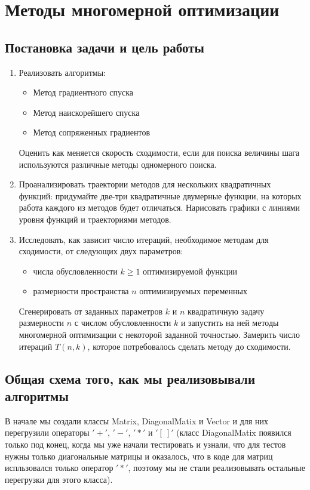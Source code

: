 \chapter{Методы многомерной оптимизации}


\section{Постановка задачи и цель работы}

\begin{enumerate}
    \item Реализовать алгоритмы:
    \begin{itemize}
        \item 	Метод градиентного спуска
        \item   Метод наискорейшего спуска
        \item   Метод сопряженных градиентов
    \end{itemize}
    Оценить как меняется скорость сходимости, если для поиска величины шага используются
    различные методы одномерного поиска.
    \item Проанализировать траектории методов для нескольких квадратичных
    функций: придумайте две-три квадратичные двумерные функции, на которых
    работа каждого из методов будет отличаться. Нарисовать графики с линиями
    уровня функций и траекториями методов.
    \item Исследовать, как зависит число итераций, необходимое методам для
    сходимости, от следующих двух параметров:
    \begin{itemize}
        \item числа обусловленности $k \geq 1$ оптимизируемой функции
        \item размерности пространства $n$ оптимизируемых переменных
    \end{itemize}
    Сгенерировать от заданных параметров $k$ и $n$ квадратичную задачу размерности $n$ с числом обусловленности
    $k$ и запустить на ней методы многомерной оптимизации с некоторой заданной точностью. Замерить число итераций $T(n, k)$, которое 
    потребовалось сделать методу до сходимости.
\end{enumerate}


\section{Общая схема того, как мы реализовывали алгоритмы}

В начале мы создали классы Matrix, DiagonalMatix и Vector и для них перегрузили операторы $'+'$, $'-'$, $'*'$ и $'[\ ]'$
 (класс DiagonalMatix появился только под конец, когда мы уже начали тестировать и узнали, что для тестов нужны только 
 диагональные матрицы и оказалось, что в коде для матриц испльзовался только оператор $'*'$, поэтому мы не стали реализовывать остальные 
 перегрузки для этого класса).

